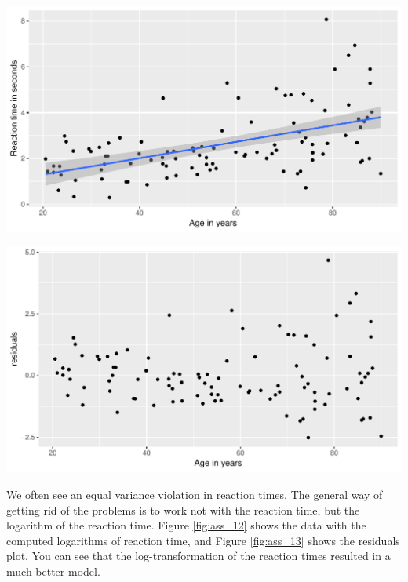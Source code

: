 \documentclass[]{report}\usepackage[]{graphicx}\usepackage[]{color}
\makeatletter
\def\maxwidth{ %
  \ifdim\Gin@nat@width>\linewidth
    \linewidth
  \else
    \Gin@nat@width
  \fi
}
\newenvironment{knitrout}{}{} %
\makeatother
\begin{document}
\begin{knitrout}
\color{fgcolor}

{\centering \includegraphics[width=\maxwidth]{figure/ass_10-1} 

}



\end{knitrout}


\begin{knitrout}
\color{fgcolor}

{\centering \includegraphics[width=\maxwidth]{figure/ass_11-1} 

}



\end{knitrout}

We often see an equal variance violation in reaction times. The general way of getting rid of the problems is to work not with the reaction time, but the logarithm of the reaction time. Figure \ref{fig:ass_12} shows the data with the computed logarithms of reaction time, and Figure \ref{fig:ass_13} shows the residuals plot. You can see that the log-transformation of the reaction times resulted in a much better model. 
\end{document}
